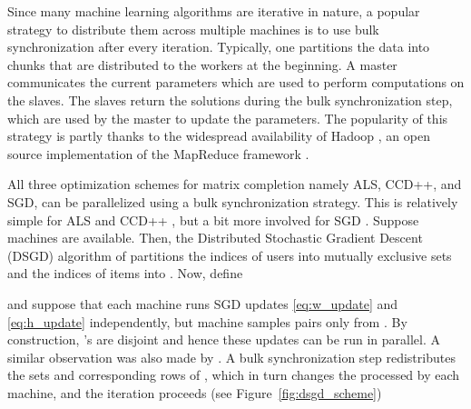 \documentclass{vldb}
\begin{document}
Since many machine learning algorithms are iterative in nature, a
popular strategy to distribute them across multiple machines is to use
bulk synchronization after every iteration. Typically, one partitions
the data into chunks that are distributed to the workers at the
beginning. A master communicates the current parameters which are used
to perform computations on the slaves. The slaves return the solutions
during the bulk synchronization step, which are used by the master to
update the parameters. The popularity of this strategy is partly thanks
to the widespread availability of Hadoop
\citep{Hadoop}, an open source implementation of the MapReduce framework
\cite{DeaGhe08}.

All three optimization schemes for matrix completion namely ALS, CCD++,
and SGD, can be parallelized using a bulk synchronization strategy. This
is relatively simple for ALS \citep{ZhoWilSchPan08} and CCD++
\citep{YuHsiSiDhi12}, but a bit more involved for SGD
\citep{GemNijHaaSis11,RecRe13}.  Suppose  machines are available.
Then, the Distributed Stochastic Gradient Descent (DSGD) algorithm of
\citet{GemNijHaaSis11} partitions the indices of users
 into mutually exclusive sets  and the indices of items into .  Now, define

and suppose that each machine runs SGD updates \eqref{eq:w_update} and
\eqref{eq:h_update} independently, but machine  samples  pairs
only from . By construction, 's are disjoint
and hence these updates can be run in parallel. A similar observation
was also made by \citet{RecRe13}. A bulk synchronization step
redistributes the sets  and corresponding rows of
, which in turn changes the  processed by each machine,
and the iteration proceeds (see Figure~\ref{fig:dsgd_scheme})
\end{document}
